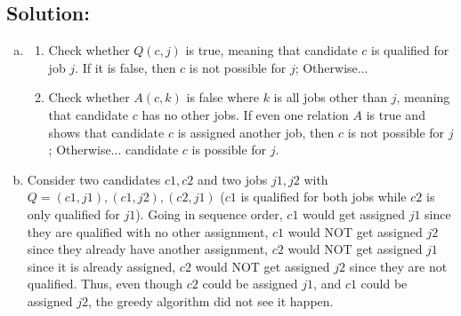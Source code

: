 \documentclass[12pt]{article}
\begin{document}
	\subsection*{\textbf{Solution:}}

	\begin{enumerate}[(a)]
		\item
			\begin{enumerate}[(1.)]
				\item Check whether $Q(c,j)$ is true, meaning that candidate $c$ is
					qualified for job $j$. If it is false, then $c$ is not possible for
					$j$; Otherwise...

				\item Check whether $A(c,k)$ is false where $k$ is all jobs other than $j$,
					meaning that candidate $c$ has no other jobs. If even one relation $A$
					is true and shows that candidate $c$ is assigned another job, then $c$
					is not possible for $j$; Otherwise... candidate $c$ is possible for
					$j$.
			\end{enumerate}

		\item Consider two candidates ${c1,c2}$ and two jobs ${j1,j2}$ with $Q={(c1,j1),(c1,j2),(c2,j1)}$
			($c1$ is qualified for both jobs while $c2$ is only qualified for $j1$).
			Going in sequence order, $c1$ would get assigned $j1$ since they are qualified
			with no other assignment, $c1$ would NOT get assigned $j2$ since they
			already have another assignment, $c2$ would NOT get assigned $j1$ since it
			is already assigned, $c2$ would NOT get assigned $j2$ since they are not
			qualified. Thus, even though $c2$ could be assigned $j1$, and $c1$ could be
			assigned $j2$, the greedy algorithm did not see it happen.
	\end{enumerate}
\end{document}
